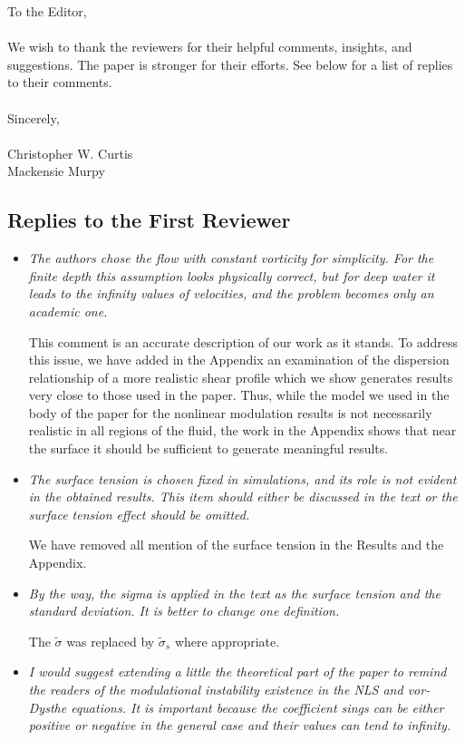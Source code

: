 \documentclass[a4paper,11pt]{article}
\begin{document}
\noindent To the Editor,\\
\\
\indent We wish to thank the reviewers for their helpful comments, insights, and suggestions.  The paper is stronger for their efforts.  See below for a list of replies to their comments.  \\
\\
\noindent Sincerely,\\
\\
Christopher W. Curtis \\
Mackensie Murpy
\subsection*{Replies to the First Reviewer}
\begin{itemize}
\item {\it The authors chose the flow with constant vorticity for simplicity. For the finite depth this assumption looks physically correct, but for deep water it leads to the infinity values of velocities, and the problem becomes only an academic one.}  

This comment is an accurate description of our work as it stands.  To address this issue, we have added in the Appendix an examination of the dispersion relationship of a more realistic shear profile which we show generates results very close to those used in the paper.  Thus, while the model we used in the body of the paper for the nonlinear modulation results is not necessarily realistic in all regions of the fluid, the work in the Appendix shows that near the surface it should be sufficient to generate meaningful results. 

\item {\it The surface tension is chosen fixed in simulations, and its role is not evident in the obtained results. This item should either be discussed in the text or the surface tension effect should be omitted.}

We have removed all mention of the surface tension in the Results and the Appendix.  

\item {\it    By the way, the sigma is applied in the text as the surface tension and the standard deviation. It is better to change one definition.
}

The $\tilde{\sigma}$ was replaced by $\tilde{\sigma}_{s}$ where appropriate.  

\item {\it  I would suggest extending a little the theoretical part of the paper to remind the readers of the modulational instability existence in the NLS and vor-Dysthe equations. It is important because the coefficient sings can be either positive or negative in the general case and their values can tend to infinity.}


\end{itemize}
\end{document}
